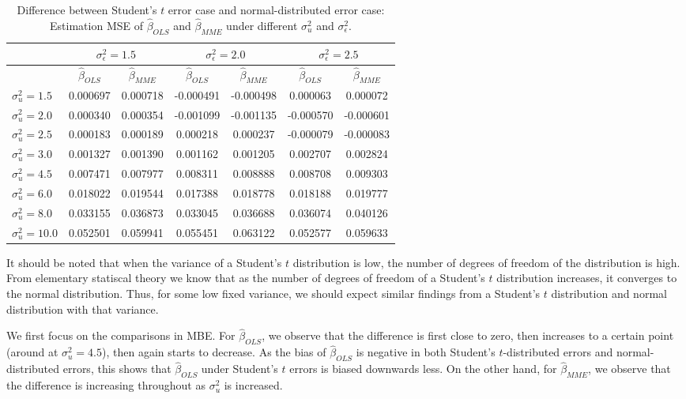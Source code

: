 \documentclass{article}
\begin{document}
\begin{table}[ht]
    \centering
    \caption{Difference between Student's $t$ error case and normal-distributed error case: Estimation MSE of $\hat{\beta}_{OLS}$ and $\hat{\beta}_{MME}$ under different $\sigma^2_u$ and $\sigma^2_\epsilon$.}
    \label{Tab:MSE_diff_t_normal}
    \begin{tabular}[t]{lcccccc}
        \hline
        &\multicolumn{2}{c}{$\sigma^2_\epsilon=1.5$}&\multicolumn{2}{c}{$\sigma^2_\epsilon=2.0$}&\multicolumn{2}{c}{$\sigma^2_\epsilon=2.5$}\\
        \hline
        &$\hat{\beta}_{OLS}$&$\hat{\beta}_{MME}$&$\hat{\beta}_{OLS}$&$\hat{\beta}_{MME}$&$\hat{\beta}_{OLS}$&$\hat{\beta}_{MME}$\\
        \hline
        $\sigma^2_u = 1.5$&0.000697&0.000718&-0.000491&-0.000498&0.000063&0.000072\\
        $\sigma^2_u = 2.0$&0.000340&0.000354&-0.001099&-0.001135&-0.000570&-0.000601\\
        $\sigma^2_u = 2.5$&0.000183&0.000189&0.000218&0.000237&-0.000079&-0.000083\\
        $\sigma^2_u = 3.0$&0.001327&0.001390&0.001162&0.001205&0.002707&0.002824\\
        $\sigma^2_u = 4.5$&0.007471&0.007977&0.008311&0.008888&0.008708&0.009303\\
        $\sigma^2_u = 6.0$&0.018022&0.019544&0.017388&0.018778&0.018188&0.019777\\
        $\sigma^2_u = 8.0$&0.033155&0.036873&0.033045&0.036688&0.036074&0.040126\\
        $\sigma^2_u = 10.0$&0.052501&0.059941&0.055451&0.063122&0.052577&0.059633\\
    \end{tabular}
\end{table}

It should be noted that when the variance of a Student's $t$ distribution is low, the number of degrees of freedom of the distribution is high. 
From elementary statiscal theory we know that as the number of degrees of freedom of a Student's $t$ distribution increases, it converges to the normal distribution.
Thus, for some low fixed variance, we should expect similar findings from a Student's $t$ distribution and normal distribution with that variance.

We first focus on the comparisons in MBE.
For $\hat{\beta}_{OLS}$, we observe that the difference is first close to zero, then increases to a certain point (around at $\sigma^2_u = 4.5$), then again starts to decrease.
As the bias of $\hat{\beta}_{OLS}$ is negative in both Student's $t$-distributed errors and normal-distributed errors, this shows that $\hat{\beta}_{OLS}$ under Student's $t$ errors is biased downwards less.
On the other hand, for $\hat{\beta}_{MME}$, we observe that the difference is increasing throughout as $\sigma^2_u$ is increased. 
\end{document}
